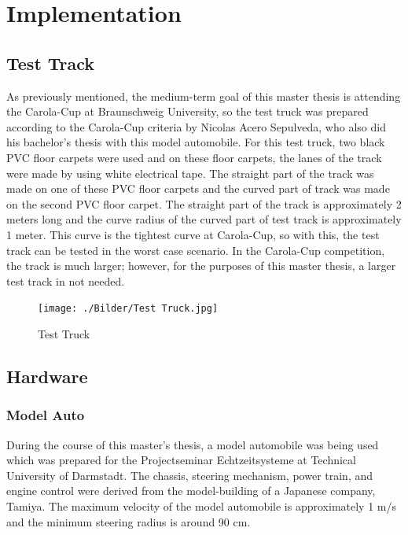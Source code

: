 %
\chapter{Implementation}\label{cha:Implementation}
%
\section{Test Track}\label{sec:Test Track}

As previously mentioned, the medium-term goal of this master thesis is attending the Carola-Cup at Braunschweig University, so the test truck was prepared according to the Carola-Cup criteria by Nicolas Acero Sepulveda, who also did his bachelor's thesis with this model automobile. For this test truck, two black PVC floor carpets were used and on these floor carpets, the lanes of the track were made by using white electrical tape. The straight part of the track was made on one of these PVC floor carpets and the curved part of track was made on the second PVC floor carpet. The straight part of the track is approximately 2 meters long and the curve radius of the curved part of test track is approximately 1 meter. This curve is the tightest curve at Carola-Cup, so with this, the test track can be tested in the worst case scenario. In the Carola-Cup competition, the track is much larger; however, for the purposes of this master thesis, a larger test track in not needed.

\begin{figure}[H]
	\centering
	\hspace*{0cm}   
	\texttt{[image: ./Bilder/Test Truck.jpg]}
	\caption{Test Truck}
\end{figure}

%
\section{Hardware}\label{sec:Hardware}



%
\subsection{Model Auto}\label{sec:Model Auto}


During the course of this master's thesis, a model automobile was being used which was prepared for the Projectseminar 
Echtzeitsysteme at Technical University of Darmstadt. The chassis, steering mechanism, power train, and engine control 
were derived from the model-building of a Japanese company, Tamiya. The maximum velocity of the model automobile is 
approximately 1 m/s and the minimum steering radius is around 90 cm. 

